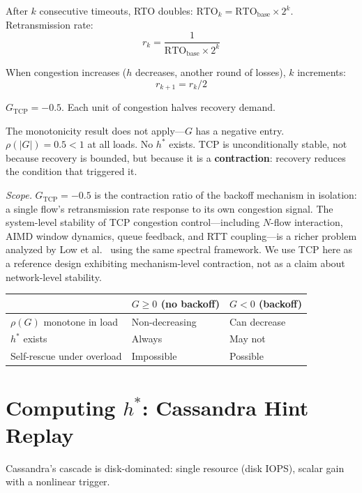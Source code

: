 \documentclass[11pt]{article}
\begin{document}
After $k$ consecutive timeouts, RTO doubles: $\mathrm{RTO}_k = \mathrm{RTO}_{\mathrm{base}} \times 2^k$.
Retransmission rate:
\begin{equation}
  r_k = \frac{1}{\mathrm{RTO}_{\mathrm{base}} \times 2^k}
\end{equation}

When congestion increases ($h$ decreases, another round of losses), $k$
increments:
\begin{equation}
  r_{k+1} = r_k / 2
\end{equation}

$G_{\mathrm{TCP}} = -0.5$. Each unit of congestion halves recovery demand.

The monotonicity result does not apply---$G$ has a negative entry.
$\rho(|G|) = 0.5 < 1$ at all loads. No $h^*$ exists. TCP is unconditionally
stable, not because recovery is bounded, but because it is a
\textbf{contraction}: recovery reduces the condition that triggered it.

\emph{Scope.} $G_{\mathrm{TCP}} = -0.5$ is the contraction ratio of the backoff
mechanism in isolation: a single flow's retransmission rate response to its own
congestion signal. The system-level stability of TCP congestion
control---including $N$-flow interaction, AIMD window dynamics, queue feedback,
and RTT coupling---is a richer problem analyzed by Low et
al.~\cite{low2002internet} using the same spectral framework. We use TCP here as
a reference design exhibiting mechanism-level contraction, not as a claim about
network-level stability.

\begin{center}
\begin{tabular}{@{}lll@{}}
\toprule
 & $G \geq 0$ (no backoff) & $G < 0$ (backoff) \\
\midrule
$\rho(G)$ monotone in load & Non-decreasing & Can decrease \\
$h^*$ exists & Always & May not \\
Self-rescue under overload & Impossible & Possible \\
\bottomrule
\end{tabular}
\end{center}

\section{Computing $h^*$: Cassandra Hint Replay}
\label{sec:cassandra-hstar}

Cassandra's cascade is disk-dominated: single resource (disk IOPS), scalar gain
with a nonlinear trigger.
\end{document}
